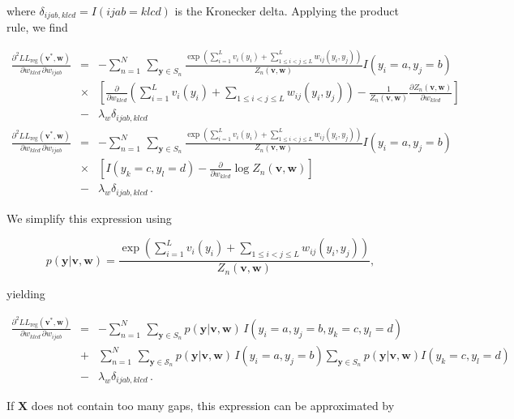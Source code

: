 \documentclass[12pt,a4paper,twoside]{book}
\newcommand{\eq}{\!=\!}
\newcommand{\LLreg}{L\!L_\mathrm{reg}}
\newcommand{\Sn}{S_n}
\renewcommand{\v}{\mathbf{v}}
\newcommand{\w}{\mathbf{w}}
\newcommand{\wijab}{w_{ijab}}
\newcommand{\wklcd}{w_{klcd}}
\newcommand{\X}{\mathbf{X}}
\theoremstyle{definition}
\theoremstyle{definition}
\theoremstyle{remark}
\begin{document}
where \(\delta_{ijab,klcd} = I(ijab=klcd)\) is the Kronecker delta.
Applying the product rule, we find

\begin{eqnarray}
    \frac{\partial^2 \LLreg(\v^*,\w)}{\partial \wklcd \, \partial \wijab  } 
    &=&  - \sum_{n=1}^{N} \, \sum_{\mathbf{y} \in \Sn} \frac{\exp \left(\sum_{i=1}^L v_i(y_i) + \sum_{1 \le i < j \le L}^L w_{ij}(y_i,y_j)  \right)}{Z_n(\v,\w)}  I(y_i \eq a, y_j \eq b) \\
    & \times & \left[ \frac{\partial}{\partial \wklcd} \left( \sum_{i=1}^L v_i(y_i) + \sum_{1 \le i < j \le L}  w_{ij}(y_i,y_j)  \right) 
                  - \frac{1}{Z_n(\v,\w)} \frac{\partial  Z_n(\v,\w) }{\partial\wklcd} \right] \\
    &-& \lambda_w \delta_{ijab,klcd} \\
    \frac{\partial^2 \LLreg(\v^*,\w)}{\partial \wklcd \, \partial \wijab  } 
    &=&  - \sum_{n=1}^{N} \, \sum_{\mathbf{y} \in \Sn} \frac{\exp \left(\sum_{i=1}^L v_i(y_i) + \sum_{1 \le i < j \le L}^L w_{ij}(y_i,y_j)  \right)}{Z_n(\v,\w)}  I(y_i \eq a, y_j \eq b) \\
    & \times & \left[ I(y_k \eq c, y_l \eq d) - \frac{\partial}{\partial \wklcd} \log Z_n(\v,\w) \right] \\
    &-& \lambda_w \delta_{ijab,klcd} \,.
\end{eqnarray}

We simplify this expression using

\begin{equation}
    p(\mathbf{y} | \v,\w) = \frac{\exp \left( \sum_{i=1}^L v_i(y_i) + \sum_{1 \le i < j \le L} w_{ij}(y_i,y_j) \right)}{Z_n(\v,\w)}  ,
\end{equation}

yielding

\begin{eqnarray}
    \frac{\partial^2 \LLreg(\v^*,\w)}{\partial \wklcd \, \partial \wijab} 
    &=&  -  \sum_{n=1}^{N} \, \sum_{\mathbf{y} \in \Sn} p(\mathbf{y} | \v,\w) \, I(y_i \eq a, y_j \eq b, y_k \eq c, y_l \eq d)  \\
    &+& \sum_{n=1}^{N} \, \sum_{\mathbf{y} \in \mathcal{S}_n} p(\mathbf{y} | \v,\w) \, I(y_i \eq a, y_j \eq b ) \sum_{\mathbf{y} \in \Sn} p(\mathbf{y} | \v,\w)  I(y_k \eq c, y_l \eq d ) \\
    &-& \lambda_w \delta_{ijab,klcd} \,.
\end{eqnarray}

If \(\X\) does not contain too many gaps, this expression can be
approximated by
\end{document}
